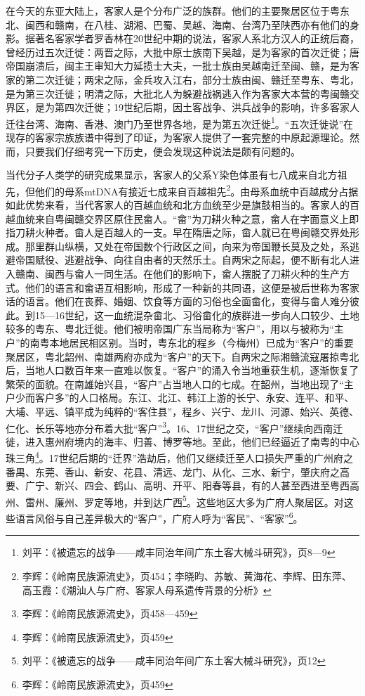在今天的东亚大陆上，客家人是个分布广泛的族群。他们的主要聚居区位于粤东北、闽西和赣南，在八桂、湖湘、巴蜀、吴越、海南、台湾乃至陕西亦有他们的身影。据著名客家学者罗香林在20世纪中期的说法，客家人系北方汉人的正统后裔，曾经历过五次迁徙：两晋之际，大批中原士族南下吴越，是为客家的首次迁徙；唐帝国崩溃后，闽主王审知大力延揽士大夫，一批士族由吴越南迁至闽、赣，是为客家的第二次迁徙；两宋之际，金兵攻入江右，部分士族由闽、赣迁至粤东、粤北，是为第三次迁徙；明清之际，大批北人为躲避战祸逃入作为客家大本营的粤闽赣交界区，是为第四次迁徙；19世纪后期，因土客战争、洪兵战争的影响，许多客家人迁往台湾、海南、香港、澳门乃至世界各地，是为第五次迁徙\footnote{刘平：《被遗忘的战争——咸丰同治年间广东土客大械斗研究》，页8—9}。“五次迁徙说”在现存的客家宗族族谱中得到了印证，为客家人提供了一套完整的中原起源理论。然而，只要我们仔细考究一下历史，便会发现这种说法是颇有问题的。

当代分子人类学的研究成果显示，客家人的父系Y染色体虽有七八成来自北方祖先，但他们的母系mtDNA有接近七成来自百越祖先\footnote{李辉：《岭南民族源流史》，页454；李晓昀、苏敏、黄海花、李辉、田东萍、高玉霞：《潮汕人与广府、客家人母系遗传背景的分析》}。由母系血统中百越成分占据如此优势来看，当代客家人的百越血统和北方血统至少是旗鼓相当的。客家人的百越血统来自粤闽赣交界区原住民畲人。“畲”为刀耕火种之意，畲人在字面意义上即指刀耕火种者。畲人是百越人的一支。早在隋唐之际，畲人就已在粤闽赣交界处形成。那里群山纵横，又处在帝国数个行政区之间，向来为帝国鞭长莫及之处，系逃避帝国赋役、逃避战争、向往自由者的天然乐土。自两宋之际起，便不断有北人进入赣南、闽西与畲人一同生活。在他们的影响下，畲人摆脱了刀耕火种的生产方式。他们的语言和畲语互相影响，形成了一种新的共同语，这便是被后世称为客家话的语言。他们在丧葬、婚姻、饮食等方面的习俗也全面畲化，变得与畲人难分彼此。到15—16世纪，这一血统混杂畲北、习俗畲化的族群进一步向人口较少、土地较多的粤东、粤北迁徙。他们被明帝国广东当局称为“客户”，用以与被称为“主户”的南粤本地居民相区别。当时，粤东北的程乡（今梅州）已成为“客户”的重要聚居区，粤北韶州、南雄两府亦成为“客户”的天下。自两宋之际湘赣流寇屠掠粤北后，当地人口数百年来一直难以恢复。“客户”的涌入令当地重获生机，逐渐恢复了繁荣的面貌。在南雄始兴县，“客户”占当地人口的七成。在韶州，当地出现了“主户少而客户多”的人口格局。东江、北江、韩江上游的长宁、永安、连平、和平、大埔、平远、镇平成为纯粹的“客住县”，程乡、兴宁、龙川、河源、始兴、英德、仁化、长乐等地亦分布着大批“客户”\footnote{李辉：《岭南民族源流史》，页458—459}。16、17世纪之交，“客户”继续向西南迁徙，进入惠州府境内的海丰、归善、博罗等地。至此，他们已经逼近了南粤的中心珠三角\footnote{李辉：《岭南民族源流史》，页459}。17世纪后期的“迁界”浩劫后，他们又继续迁至人口损失严重的广州府之番禺、东莞、香山、新安、花县、清远、龙门、从化、三水、新宁，肇庆府之高要、广宁、新兴、四会、鹤山、高明、开平、阳春等县，有的人甚至西进至粤西高州、雷州、廉州、罗定等地，并到达广西\footnote{刘平：《被遗忘的战争——咸丰同治年间广东土客大械斗研究》，页12}。这些地区大多为广府人聚居区。对这些语言风俗与自己差异极大的“客户”，广府人呼为“客民”、“客家”\footnote{李辉：《岭南民族源流史》，页459}。

